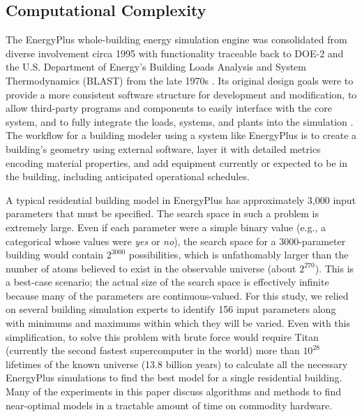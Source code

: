 \documentclass[preprint, review, 12pt]{elsarticle}
\begin{document}
\subsection{Computational Complexity}
The EnergyPlus whole-building energy simulation engine was consolidated from diverse involvement circa 1995 with functionality traceable back to DOE-2 and the U.S. Department of Energy's Building Loads Analysis and System Thermodynamics (BLAST) from the late 1970s \cite{cit:energyplus}. Its original design goals were to provide a more consistent software structure for development and modification, to allow third-party programs and components to easily interface with the core system, and to fully integrate the loads, systems, and plants into the simulation \cite{cit:energyplus}. The workflow for a building modeler using a system like EnergyPlus is to create a building's geometry using external software, layer it with detailed metrics encoding material properties, and add equipment currently or expected to be in the building, including anticipated operational schedules.

A typical residential building model in EnergyPlus has approximately 3,000 input parameters that must be specified. The search space in such a problem is extremely large. Even if each parameter were a simple binary value (e.g., a categorical whose values were \emph{yes} or \emph{no}), the search space for a 3000-parameter building would contain $2^{3000}$ possibilities, which is unfathomably larger than the number of atoms believed to exist in the observable universe (about $2^{270}$). This is a best-case scenario; the actual size of the search space is effectively infinite because many of the parameters are continuous-valued. For this study, we relied on several building simulation experts to identify 156 input parameters along with minimums and maximums within which they will be varied. Even with this simplification, to solve this problem with brute force would require Titan (currently the second fastest supercomputer in the world) more than $10^{28}$ lifetimes of the known universe (13.8 billion years) to calculate all the necessary EnergyPlus simulations to find the best model for a single residential building. Many of the experiments in this paper discuss algorithms and methods to find near-optimal models in a tractable amount of time on commodity hardware.
\end{document}
